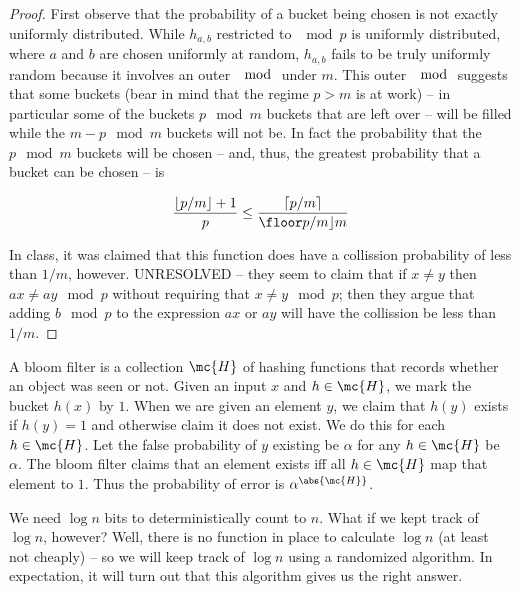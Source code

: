 \documentclass[../main.tex]{subfiles}
\begin{document}
\begin{proof}
    First observe that the probability of a bucket being chosen is not exactly uniformly distributed. While $h_{a,b}$ restricted to $\mod p$ is uniformly distributed, where $a$ and $b$ are chosen uniformly at random, $h_{a,b}$ fails to be truly uniformly random because it involves an outer $\mod$ under $m$. This outer $\mod$ suggests that some buckets (bear in mind that
    the regime $p > m$ is at work) -- in particular some of the buckets $p \mod m$ buckets that are left over -- will be filled while the $m - p \mod m$ buckets will not be. In fact the probability that the $p \mod m$ buckets will be chosen -- and, thus, the greatest probability that a bucket can be chosen -- is

    \[
        \frac{\lfloor p/m \rfloor + 1}{p} \leq \frac{\lceil p/m \rceil}{\floor p/m \rfloor m} 
    \]


    In class, it was claimed that this function does have a collission probability of less than $1/m$, however. UNRESOLVED -- they seem to claim that if $x \not = y$ then $ax \not = ay \mod p$ without requiring that $x \not = y \mod p$; then they argue that adding $b \mod p$ to the expression $ax$ or $ay$ will have the collission be less than $1/m$.
\end{proof}

\begin{definition}
    A bloom filter is a collection $\mc{H}$ of hashing functions that records whether an object was seen or not. Given an input $x$ and $h \in \mc{H}$, we mark the bucket $h(x)$ by $1$. When we are given an element $y$, we claim that $h(y)$ exists if $h(y) = 1$ and otherwise claim it does not exist. We do this for each $h \in \mc{H}$. Let the false probability of $y$ existing be $\alpha$ for any $h \in \mc{H}$ be $\alpha$. The bloom filter claims that an element exists iff all $h \in \mc{H}$ map that element to $1$. Thus the probability of error is $\alpha^{\abs{\mc{H}}}$.
\end{definition}


\begin{remark}
    We need $\log n$ bits to deterministically count to $n$. What if we kept track of $\log n$, however? Well, there is no function in place to calculate $\log n$ (at least not cheaply) -- so we will keep track of $\log n$ using a randomized algorithm. In expectation, it will turn out that this algorithm gives us the right answer.
\end{remark}
\end{document}
